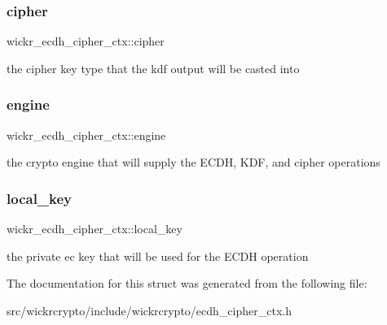 \subsubsection{\texorpdfstring{cipher}{cipher}}
{\footnotesize\ttfamily wickr\+\_\+ecdh\+\_\+cipher\+\_\+ctx\+::cipher}

the cipher key type that the kdf output will be casted into \mbox{\label{structwickr__ecdh__cipher__ctx_a4d953a0c8d6302db63f2fce624e6ffc2}} 
\subsubsection{\texorpdfstring{engine}{engine}}
{\footnotesize\ttfamily wickr\+\_\+ecdh\+\_\+cipher\+\_\+ctx\+::engine}

the crypto engine that will supply the E\+C\+DH, K\+DF, and cipher operations \mbox{\label{structwickr__ecdh__cipher__ctx_ad9389a9efc31ac0516d9aebeb1ac6301}} 
\subsubsection{\texorpdfstring{local\+\_\+key}{local\_key}}
{\footnotesize\ttfamily wickr\+\_\+ecdh\+\_\+cipher\+\_\+ctx\+::local\+\_\+key}

the private ec key that will be used for the E\+C\+DH operation 

The documentation for this struct was generated from the following file\+:\begin{DoxyCompactItemize}
\item 
src/wickrcrypto/include/wickrcrypto/ecdh\+\_\+cipher\+\_\+ctx.\+h\end{DoxyCompactItemize}
